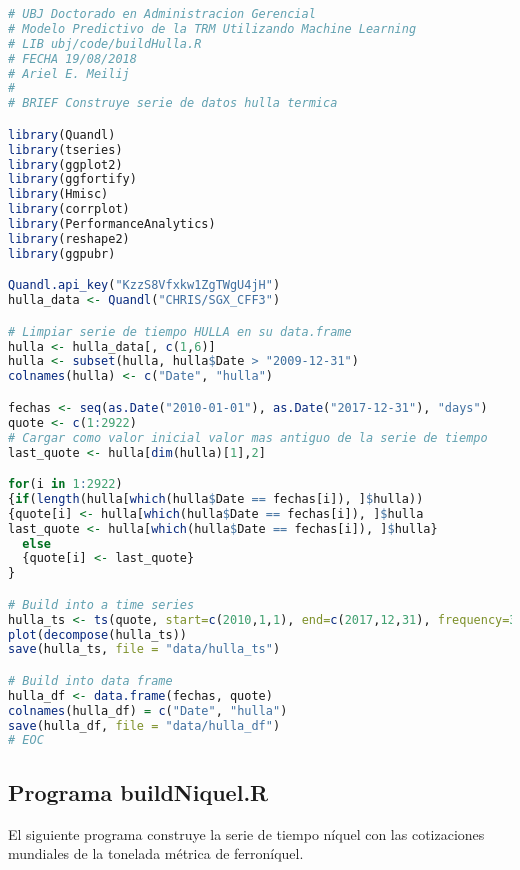 \begin{lstlisting}[language=R]
# UBJ Doctorado en Administracion Gerencial
# Modelo Predictivo de la TRM Utilizando Machine Learning
# LIB ubj/code/buildHulla.R 
# FECHA 19/08/2018
# Ariel E. Meilij
#
# BRIEF Construye serie de datos hulla termica

library(Quandl)
library(tseries)
library(ggplot2)
library(ggfortify)
library(Hmisc)
library(corrplot)
library(PerformanceAnalytics)
library(reshape2)
library(ggpubr)

Quandl.api_key("KzzS8Vfxkw1ZgTWgU4jH")
hulla_data <- Quandl("CHRIS/SGX_CFF3")

# Limpiar serie de tiempo HULLA en su data.frame
hulla <- hulla_data[, c(1,6)]
hulla <- subset(hulla, hulla$Date > "2009-12-31")
colnames(hulla) <- c("Date", "hulla")

fechas <- seq(as.Date("2010-01-01"), as.Date("2017-12-31"), "days")
quote <- c(1:2922)
# Cargar como valor inicial valor mas antiguo de la serie de tiempo
last_quote <- hulla[dim(hulla)[1],2]

for(i in 1:2922)
{if(length(hulla[which(hulla$Date == fechas[i]), ]$hulla))
{quote[i] <- hulla[which(hulla$Date == fechas[i]), ]$hulla
last_quote <- hulla[which(hulla$Date == fechas[i]), ]$hulla}
  else
  {quote[i] <- last_quote}
}

# Build into a time series
hulla_ts <- ts(quote, start=c(2010,1,1), end=c(2017,12,31), frequency=365)
plot(decompose(hulla_ts))
save(hulla_ts, file = "data/hulla_ts")

# Build into data frame
hulla_df <- data.frame(fechas, quote)
colnames(hulla_df) = c("Date", "hulla")
save(hulla_df, file = "data/hulla_df")
# EOC
\end{lstlisting}

\subsection{Programa buildNiquel.R}
El siguiente programa construye la serie de tiempo níquel con las cotizaciones mundiales de la tonelada métrica de ferroníquel.

